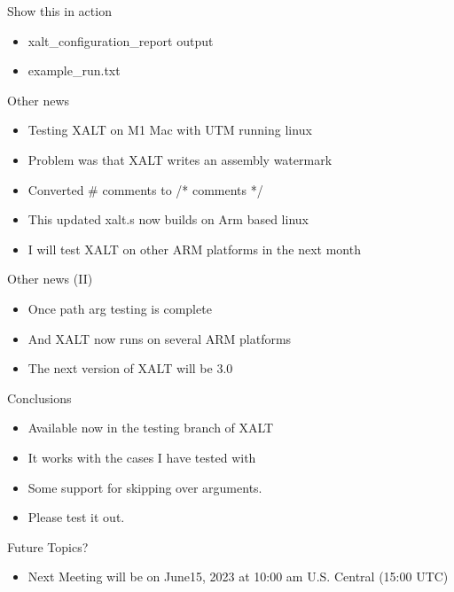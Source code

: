 \documentclass{beamer}
\begin{document}
\begin{frame}{Show this in action}
  \begin{itemize}
    \item xalt\_configuration\_report output
    \item example\_run.txt
  \end{itemize}
\end{frame}

\begin{frame}{Other news}
  \begin{itemize}
    \item Testing XALT on M1 Mac with UTM running linux
    \item Problem was that XALT writes an assembly watermark
    \item Converted \# comments to /* comments */
    \item This updated xalt.s now builds on Arm based linux
    \item I will test XALT on other ARM platforms in the next month
  \end{itemize}
\end{frame}

\begin{frame}{Other news (II)}
  \begin{itemize}
    \item Once path arg testing is complete
    \item And XALT now runs on several ARM platforms
    \item The next version of XALT will be 3.0
  \end{itemize}
\end{frame}

\begin{frame}{Conclusions}
  \begin{itemize}
    \item Available now in the testing branch of XALT
    \item It works with the cases I have tested with
    \item Some support for skipping over arguments.
    \item Please test it out.
  \end{itemize}
\end{frame}

\begin{frame}{Future Topics?}
  \begin{itemize}
    \item Next Meeting will be on June15, 2023 at 10:00 am
      U.S. Central (15:00 UTC)
  \end{itemize}
\end{frame}

%
\end{document}
